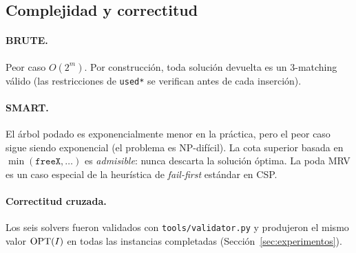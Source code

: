 \subsection{Complejidad y correctitud}
\label{sec:impl:correctitud}

\paragraph{BRUTE.}  Peor caso $O(2^m)$.  Por construcción, toda solución
devuelta es un 3-matching válido (las restricciones de \texttt{used*} se
verifican antes de cada inserción).

\paragraph{SMART.}  El árbol podado es exponencialmente menor en la
práctica, pero el peor caso sigue siendo exponencial (el problema es
NP-difícil).  La cota superior basada en $\min(\texttt{freeX},\ldots)$
es \emph{admisible}: nunca descarta la solución óptima.  La poda MRV
es un caso especial de la heurística de \emph{fail-first} estándar en CSP.

\paragraph{Correctitud cruzada.}  Los seis solvers fueron validados con
\texttt{tools/validator.py} y produjeron el mismo valor $\operatorname{OPT}(I)$ en todas
las instancias completadas (Sección~\ref{sec:experimentos}).
